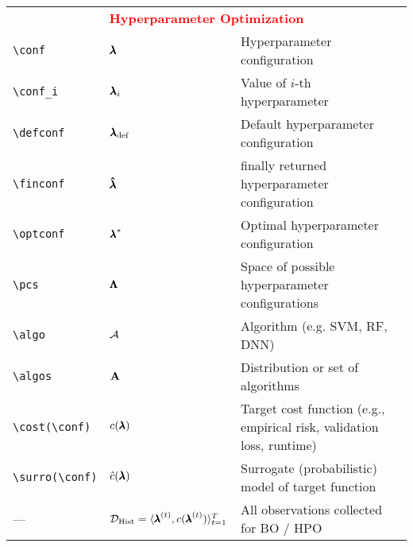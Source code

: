 \documentclass[]{article}
\begin{document}
\begin{table}
\begin{tabular}{lll}
		\midrule
		\multicolumn{3}{c}{\textcolor{red}{\textbf{Hyperparameter Optimization}}}\\
		 \verb!\conf!  & $\pmb{\lambda}$ & Hyperparameter configuration\\
		 \verb!\conf_i!  & $\pmb{\lambda}_i$ & Value of $i$-th hyperparameter \\
		 \verb!\defconf!  & ${\pmb{\lambda}}_{\text{def}}$ & Default hyperparameter configuration\\
		 \verb!\finconf!  & $\pmb{\hat{\lambda}}$ & finally returned hyperparameter configuration\\
		 \verb!\optconf!  & ${\pmb{\lambda}}^*$ & Optimal hyperparameter configuration\\
		 \verb!\pcs!  & $\pmb{\Lambda}$ &  Space of possible hyperparameter configurations\\
		 \verb!\algo!  & $\mathcal{A}$ & Algorithm (e.g. SVM, RF, DNN) \\
		 \verb!\algos!  & $\mathbf{A}$ & Distribution or set of algorithms\\
		 \verb!\cost(\conf)!  & $c(\pmb{\lambda})$ & Target cost function (e.g., empirical risk, validation loss, runtime)\\
		 \verb!\surro(\conf)!  & $\hat{c}(\pmb{\lambda})$ & Surrogate (probabilistic) model of target function\\
		 ---  & $\mathcal{D}_{\text{Hist}} = \langle {\pmb{\lambda}}^{(t)}, c({\pmb{\lambda}}^{(t)}) \rangle_{t=1}^T$ &  All observations collected for BO / HPO\\
		

\end{tabular}
\end{table}
\end{document}
